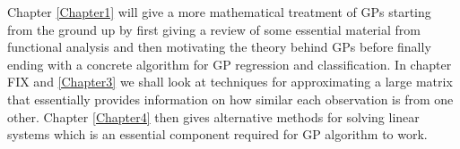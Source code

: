 Chapter \ref{Chapter1} will give a more mathematical treatment of GPs starting from the ground up by first giving a review of some essential material from functional analysis and then motivating the theory behind GPs before finally ending with a concrete algorithm for GP regression and classification. In chapter FIX and \ref{Chapter3} we shall look at techniques for approximating a large matrix that essentially provides information on how similar each observation is from one other. Chapter \ref{Chapter4} then gives alternative methods for solving linear systems which is an essential component required for GP algorithm to work.

\newpage
{}

